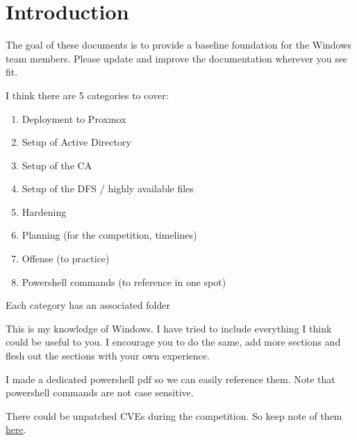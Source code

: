 \documentclass{article}
\begin{document}
\graphicspath{ {./Images/} }
\tableofcontents

\section{Introduction}
The goal of these documents is to provide a baseline foundation for the Windows team members.
Please update and improve the documentation wherever you see fit.

I think there are 5 categories to cover:

\begin{enumerate}
        \item Deployment to Proxmox
        \item Setup of Active Directory
        \item Setup of the CA
        \item Setup of the DFS / highly available files
        \item Hardening
        \item Planning (for the competition, timelines)
        \item Offense (to practice)
        \item Powershell commands (to reference in one spot)
\end{enumerate}

Each category has an associated folder

This is my knowledge of Windows. I have tried to include everything I think could be useful to you.
I encourage you to do the same, add more sections and flesh out the sections with your own experience.

I made a dedicated powershell pdf so we can easily reference them.
Note that powershell commands are not case sensitive.

There could be unpatched CVEs during the competition. So keep note of them \href{https://stack.watch/product/microsoft/windows-server-2019/}{here}.
\end{document}
